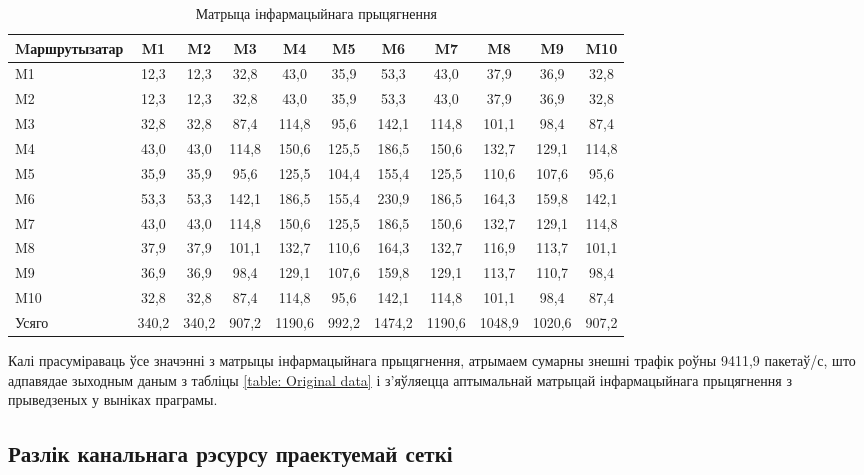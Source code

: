 \begin{table}[htp]
    \caption{Матрыца інфармацыйнага прыцягнення}
    \begin{tabularx}{\textwidth}{|>{\centering\arraybackslash}m{1.65cm}
                                 |c|c|c|c|c|c|c|c|c|c|}
        \hline
        Mаршрутызатар
            & M1   & M2   & M3    & M4    & M5    & M6    & M7    & M8    & M9    & M10 \\
        \hline
        M1  & 12,3 & 12,3 & 32,8  & 43,0  & 35,9  & 53,3  & 43,0  & 37,9  & 36,9  & 32,8 \\
        \hline
        M2  & 12,3 & 12,3 & 32,8  & 43,0  & 35,9  & 53,3  & 43,0  & 37,9  & 36,9  & 32,8 \\
        \hline
        M3  & 32,8 & 32,8 & 87,4  & 114,8 & 95,6  & 142,1 & 114,8 & 101,1 & 98,4  & 87,4 \\
        \hline
        M4  & 43,0 & 43,0 & 114,8 & 150,6 & 125,5 & 186,5 & 150,6 & 132,7 & 129,1 & 114,8 \\
        \hline
        M5  & 35,9 & 35,9 & 95,6  & 125,5 & 104,4 & 155,4 & 125,5 & 110,6 & 107,6 & 95,6 \\
        \hline
        M6  & 53,3 & 53,3 & 142,1 & 186,5 & 155,4 & 230,9 & 186,5 & 164,3 & 159,8 & 142,1 \\
        \hline
        M7  & 43,0 & 43,0 & 114,8 & 150,6 & 125,5 & 186,5 & 150,6 & 132,7 & 129,1 & 114,8 \\
        \hline
        M8  & 37,9 & 37,9 & 101,1 & 132,7 & 110,6 & 164,3 & 132,7 & 116,9 & 113,7 & 101,1 \\
        \hline
        M9  & 36,9 & 36,9 & 98,4  & 129,1 & 107,6 & 159,8 & 129,1 & 113,7 & 110,7 & 98,4 \\
        \hline
        M10 & 32,8 & 32,8 & 87,4  & 114,8 & 95,6  & 142,1 & 114,8 & 101,1 & 98,4  & 87,4 \\
        \hline
        Усяго & 340,2 & 340,2 & 907,2 & 1190,6 & 992,2 & 1474,2 & 1190,6 & 1048,9 & 1020,6 & 907,2 \\
        \hline
    \end{tabularx}
    \label{table: Matrix}
\end{table}

Калі прасуміраваць ўсе значэнні з матрыцы інфармацыйнага прыцягнення,
атрымаем сумарны знешні трафік роўны 9411,9 пакетаў/с,
што адпавядае зыходным даным з табліцы
\ref{table: Original data} і з'яўляецца аптымальнай матрыцай
інфармацыйнага прыцягнення з прыведзеных у выніках праграмы.

\subsection{Разлік канальнага рэсурсу праектуемай сеткі}

